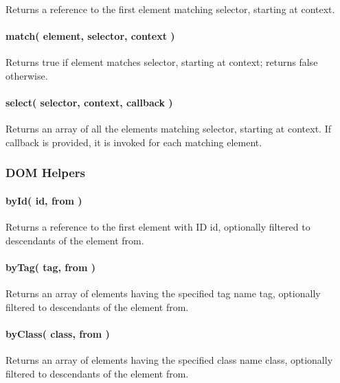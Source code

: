 Returns a reference to the first element matching {\ttfamily selector}, starting at {\ttfamily context}.

\paragraph*{{\ttfamily match( element, selector, context )}}

Returns {\ttfamily true} if {\ttfamily element} matches {\ttfamily selector}, starting at {\ttfamily context}; returns {\ttfamily false} otherwise.

\paragraph*{{\ttfamily select( selector, context, callback )}}

Returns an array of all the elements matching {\ttfamily selector}, starting at {\ttfamily context}. If {\ttfamily callback} is provided, it is invoked for each matching element.

\subsubsection*{D\+OM Helpers}

\paragraph*{{\ttfamily by\+Id( id, from )}}

Returns a reference to the first element with ID {\ttfamily id}, optionally filtered to descendants of the element {\ttfamily from}.

\paragraph*{{\ttfamily by\+Tag( tag, from )}}

Returns an array of elements having the specified tag name {\ttfamily tag}, optionally filtered to descendants of the element {\ttfamily from}.

\paragraph*{{\ttfamily by\+Class( class, from )}}

Returns an array of elements having the specified class name {\ttfamily class}, optionally filtered to descendants of the element {\ttfamily from}.

